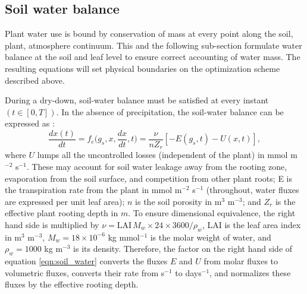 \documentclass[utf8]{frontiersSCNS} %
\begin{document}
\subsection{Soil water balance}

Plant water use is bound by conservation of mass at every point along the soil, plant, atmosphere continuum. This and the following sub-section formulate water balance at the soil and leaf level to ensure correct accounting of water mass. The resulting equations will set physical boundaries on the optimization scheme described above.

During a dry-down, soil-water balance must be satisfied at every instant $(t \in [0,T])$. In the absence of precipitation, the soil-water balance can be expressed as \citep{rodriguez-iturbe_ecohydrology_2007}:
\begin{equation}
    \label{eqn:soil_water}
    \frac{dx(t)}{dt} = f_e\Big(g_s, x, \frac{dx}{dt}, t\Big) = \frac{\nu}{ n Z_r}[- E(g_s, t) - U(x, t)],
\end{equation}
where $U$ lumps all the uncontrolled losses (independent of the plant) in mmol m$^{-2}$ s$^{-1}$. These may account for soil water leakage away from the rooting zone, evaporation from the soil surface, and competition from other plant roots; E is the transpiration rate from the plant in mmol m$^{-2}$ s$^{-1}$ (throughout, water fluxes are expressed per unit leaf area);  $n$ is the soil porosity in m$^3$ m$^{-3}$; and $Z_r$ is the effective plant rooting depth in $m$. To ensure dimensional equivalence, the right hand side is multiplied by $\nu = \text{LAI} \, M_w \times 24 \times 3600 / \rho_w$, LAI is the leaf area index in m$^3$ m$^{-3}$, $M_w = 18 \times 10^{-6}$ kg mmol$^{-1}$ is the molar weight of water, and $\rho_w = 1000$ kg m$^{-3}$ is its density. Therefore, the factor on the right hand side of equation \ref{eqn:soil_water} converts the fluxes $E$ and $U$ from molar fluxes to volumetric fluxes, converts their rate from s$^{-1}$ to days${^{-1}}$, and normalizes these fluxes by the effective rooting depth.
\end{document}
